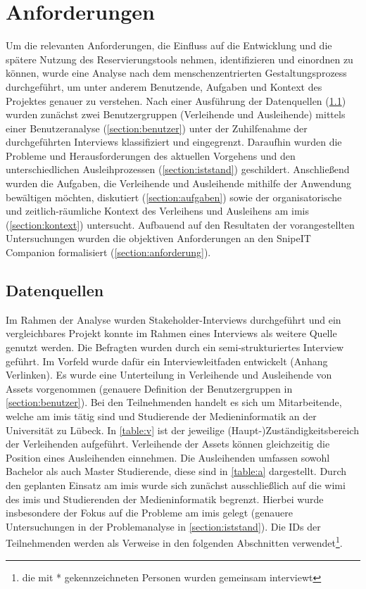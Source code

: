 
\chapter{Anforderungen}
\label{chapter-analyse}

Um die relevanten Anforderungen, die Einfluss auf die Entwicklung und die spätere Nutzung des
Reservierungstools nehmen, identifizieren und einordnen zu können, wurde eine Analyse nach dem
menschenzentrierten Gestaltungsprozess durchgeführt, um unter anderem Benutzende, Aufgaben und
Kontext des Projektes genauer zu verstehen. Nach einer Ausführung der Datenquellen
(\ref{section:daten}) wurden zunächst zwei Benutzergruppen (Verleihende und Ausleihende) mittels
einer Benutzeranalyse (\ref{section:benutzer}) unter der Zuhilfenahme der durchgeführten Interviews
klassifiziert und eingegrenzt. Daraufhin wurden die Probleme und Herausforderungen des aktuellen
Vorgehens und den unterschiedlichen Ausleihprozessen (\ref{section:iststand}) geschildert.
Anschließend wurden die Aufgaben, die Verleihende und Ausleihende mithilfe der Anwendung bewältigen
möchten, diskutiert (\ref{section:aufgaben}) sowie der organisatorische und zeitlich-räumliche
Kontext des Verleihens und Ausleihens am \ac{imis} (\ref{section:kontext}) untersucht. Aufbauend auf
den Resultaten der vorangestellten Untersuchungen wurden die objektiven Anforderungen an den SnipeIT
Companion formalisiert (\ref{section:anforderung}).

\section{Datenquellen}
\label{section:daten}
Im Rahmen der Analyse wurden Stakeholder-Interviews durchgeführt und ein vergleichbares Projekt
konnte im Rahmen eines Interviews als weitere Quelle genutzt werden. Die Befragten wurden durch ein
semi-strukturiertes Interview geführt. Im Vorfeld wurde dafür ein Interviewleitfaden entwickelt
(Anhang Verlinken). Es wurde eine Unterteilung in Verleihende und Ausleihende von Assets vorgenommen
(genauere Definition der Benutzergruppen in \ref{section:benutzer}). Bei den Teilnehmenden handelt
es sich um Mitarbeitende, welche am \ac{imis} tätig sind und Studierende der Medieninformatik an der
Universität zu Lübeck. In \ref{table:v} ist der jeweilige (Haupt-)Zuständigkeitsbereich der
Verleihenden aufgeführt. Verleihende der Assets können gleichzeitig die Position eines Ausleihenden
einnehmen. Die Ausleihenden umfassen sowohl Bachelor als auch Master Studierende, diese sind in
\ref{table:a} dargestellt. Durch den geplanten Einsatz am \ac{imis} wurde sich zunächst
ausschließlich auf die \ac{wimi} des \ac{imis} und Studierenden der Medieninformatik begrenzt.
Hierbei wurde insbesondere der Fokus auf die Probleme am \ac*{imis} gelegt (genauere Untersuchungen
in der Problemanalyse in \ref{section:iststand}). Die IDs der Teilnehmenden werden als Verweise in
den folgenden Abschnitten verwendet\footnote{die mit * gekennzeichneten Personen wurden gemeinsam
interviewt}.

